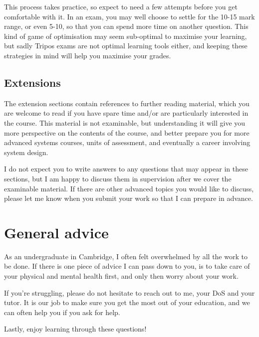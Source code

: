 \documentclass[12pt,a4paper,oneside,openright]{report}
\begin{document}
This process takes practice, so expect to need a few attempts before
you get comfortable with it. In an exam, you may well choose to settle
for the 10-15 mark range, or even 5-10, so that you can spend more
time on another question. This kind of game of optimisation may seem
sub-optimal to maximise your learning, but sadly Tripos exams are not
optimal learning tools either, and keeping these strategies in mind
will help you maximise your grades.
  
\subsection*{Extensions}

The extension sections contain references to further reading material,
which you are welcome to read if you have spare time and/or are
particularly interested in the course. This material is not
examinable, but understanding it will give you more perspective on the
contents of the course, and better prepare you for more advanced
systems courses, units of assessment, and eventually a career
involving system design.

I do not expect you to write answers to any questions that may appear
in these sections, but I am happy to discuss them in supervision after
we cover the examinable material. If there are other advanced topics
you would like to discuss, please let me know when you submit your
work so that I can prepare in advance.

\section*{General advice}

As an undergraduate in Cambridge, I often felt overwhelmed by all the
work to be done. If there is one piece of advice I can pass down to
you, is to take care of your physical and mental health first, and
only then worry about your work.

If you're struggling, please do not hesitate to reach out to me, your
DoS and your tutor. It is our job to make sure you get the most out of
your education, and we can often help you if you ask for help.

Lastly, enjoy learning through these questions!

\newpage


\end{document}
